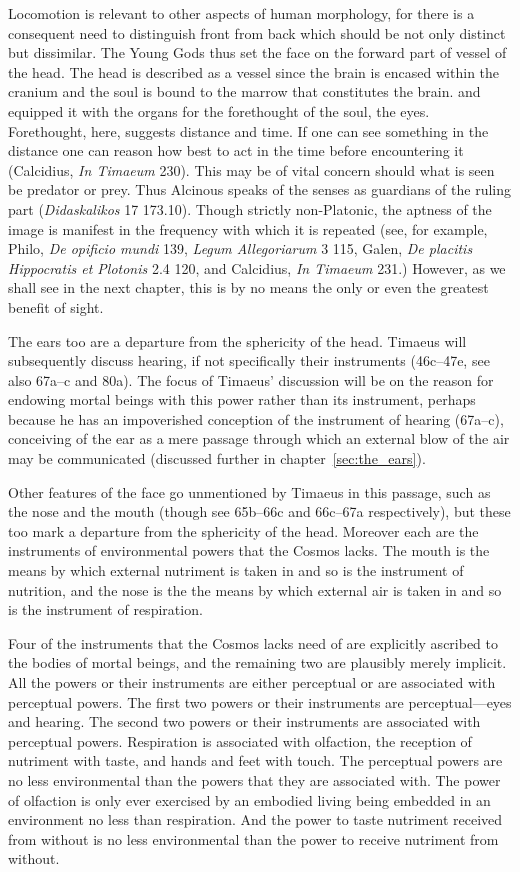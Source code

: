 Locomotion is relevant to other aspects of human morphology, for there is a consequent need to distinguish front from back which should be not only distinct but dissimilar. The Young Gods thus set the face on the forward part of vessel of the head. The head is described as a vessel since the brain is encased within the cranium and the soul is bound to the marrow that constitutes the brain. and equipped it with the organs for the forethought of the soul, the eyes. Forethought, here, suggests distance and time. If one can see something in the distance one can reason how best to act in the time before encountering it (Calcidius, \emph{In Timaeum} 230). This may be of vital concern should what is seen be predator or prey. Thus Alcinous speaks of the senses as guardians of the ruling part (\emph{Didaskalikos} 17 173.10). Though strictly non-Platonic, the aptness of the image is manifest in the frequency with which it is repeated (see, for example, Philo, \emph{De opificio mundi} 139, \emph{Legum Allegoriarum} 3 115, Galen, \emph{De placitis Hippocratis et Plotonis} 2.4 120, and Calcidius, \emph{In Timaeum} 231.) However, as we shall see in the next chapter, this is by no means the only or even the greatest benefit of sight. 

The ears too are a departure from the sphericity of the head. Timaeus will subsequently discuss hearing, if not specifically their instruments (46c–47e, see also 67a--c and 80a). The focus of Timaeus' discussion will be on the reason for endowing mortal beings with this power rather than its instrument, perhaps because he has an impoverished conception of the instrument of hearing (67a--c), conceiving of the ear as a mere passage through which an external blow of the air may be communicated (discussed further in chapter~\ref{sec:the_ears}). 

Other features of the face go unmentioned by Timaeus in this passage, such as the nose and the mouth (though see 65b--66c and 66c--67a respectively), but these too mark a departure from the sphericity of the head. Moreover each are the instruments of environmental powers that the Cosmos lacks. The mouth is the means by which external nutriment is taken in and so is the instrument of nutrition, and the nose is the the means by which external air is taken in and so is the instrument of respiration. 

Four of the instruments that the Cosmos lacks need of are explicitly ascribed to the bodies of mortal beings, and the remaining two are plausibly merely implicit. All the powers or their instruments are either perceptual or are associated with perceptual powers. The first two powers or their instruments are perceptual---eyes and hearing. The second two powers or their instruments are associated with perceptual powers. Respiration is associated with olfaction, the reception of nutriment with taste, and hands and feet with touch. The perceptual powers are no less environmental than the powers that they are associated with. The power of olfaction is only ever exercised by an embodied living being embedded in an environment no less than respiration. And the power to taste nutriment received from without is no less environmental than the power to receive nutriment from without. 

